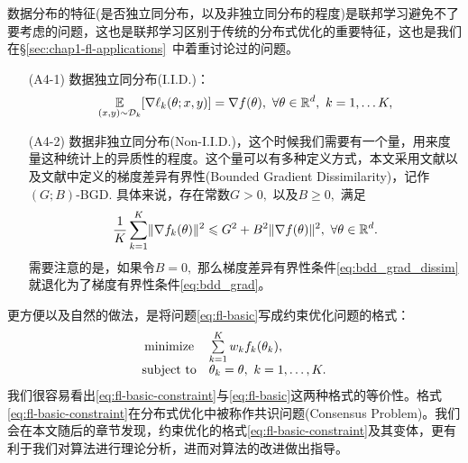 数据分布的特征(是否独立同分布，以及非独立同分布的程度)是联邦学习避免不了要考虑的问题，这也是联邦学习区别于传统的分布式优化的重要特征，这也是我们在\S\ref{sec:chap1-fl-applications}~中着重讨论过的问题。
\begin{itemize}
\item[(A4-1)] 数据独立同分布(I.I.D.)：
\begin{equation}
\label{eq:iid-1}
\operatorname*{\mathbb{E}}\limits_{(x, y) \sim \mathcal{D}_k}[\nabla \ell_k(\theta; x, y)] = \nabla f(\theta), ~ \forall \theta \in \mathbb{R}^d, ~ k = 1, \ldots K,
\end{equation}
\item[(A4-2)] 数据非独立同分布(Non-I.I.D.)，这个时候我们需要有一个量，用来度量这种统计上的异质性的程度。这个量可以有多种定义方式，本文采用文献\parencite{karimireddy2020scaffold}以及文献\cite{zhang2020fedpd}中定义的梯度差异有界性(Bounded Gradient Dissimilarity)，记作$(G; B)$-BGD. 具体来说，存在常数$G > 0,$ 以及$B \geqslant 0,$ 满足
\begin{equation}
\label{eq:bdd_grad_dissim}
\dfrac{1}{K} \sum\limits_{k=1}^K \lVert \nabla f_k(\theta) \rVert^2 \leqslant G^2 + B^2 \lVert \nabla f(\theta) \rVert^2, ~ \forall \theta \in \mathbb{R}^d.
\end{equation}
需要注意的是，如果令$B = 0,$ 那么梯度差异有界性条件\eqref{eq:bdd_grad_dissim}就退化为了梯度有界性条件\eqref{eq:bdd_grad}。
\end{itemize}

更方便以及自然的做法，是将问题\eqref{eq:fl-basic}写成约束优化问题的格式：
\begin{equation}
\label{eq:fl-basic-constraint}
\begin{array}{cl}
\begin{array}{cl}
\operatorname*{minimize} & \sum\limits_{k=1}^K w_k f_k(\theta_k), \\
\text{subject to} & \theta_k = \theta, ~ k = 1, \ldots, K.
\end{array}
\end{array}
\end{equation}
我们很容易看出\eqref{eq:fl-basic-constraint}与\eqref{eq:fl-basic}这两种格式的等价性。格式\eqref{eq:fl-basic-constraint}在分布式优化中被称作共识问题(Consensus Problem)。我们会在本文随后的章节发现，约束优化的格式\eqref{eq:fl-basic-constraint}及其变体，更有利于我们对算法进行理论分析，进而对算法的改进做出指导。

